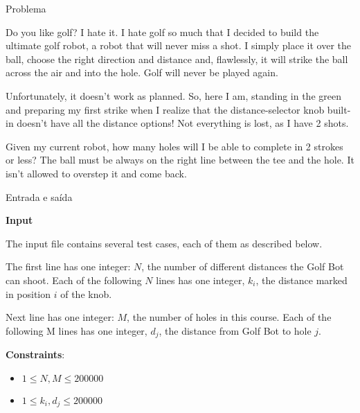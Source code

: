 
\begin{frame}[fragile]{Problema}

Do you like golf? I hate it. I hate golf so much that I decided to build the ultimate golf robot,
a robot that will never miss a shot. I simply place it over the ball, choose the right direction
and distance and, flawlessly, it will strike the ball across the air and into the hole.  Golf will
never be played again.

Unfortunately, it doesn’t work as planned. So, here I am, standing in the green and preparing my
first strike when I realize that the distance-selector knob built-in doesn’t have all the distance
options! Not everything is lost, as I have 2 shots.

Given my current robot, how many holes will I be able to complete in 2 strokes or less? The ball
must be always on the right line between the tee and the hole.  It isn’t allowed to overstep it
and come back.

\end{frame}

\begin{frame}[fragile]{Entrada e saída}

\textbf{Input}

The input file contains several test cases, each of them as described below.

The first line has one integer: $N$, the number of different distances the Golf Bot can shoot. Each
of the following $N$ lines has one integer, $k_i$, the distance marked in position $i$ of the knob.

Next line has one integer: $M$, the number of holes in this course. Each of the following M lines
has one integer, $d_j$, the distance from Golf Bot to hole $j$.

\textbf{Constraints}:

\begin{itemize}
    \item $1\leq N, M\leq 200 000$
    \item $1\leq k_i , d_j\leq 200 000$
\end{itemize}

\end{frame}

